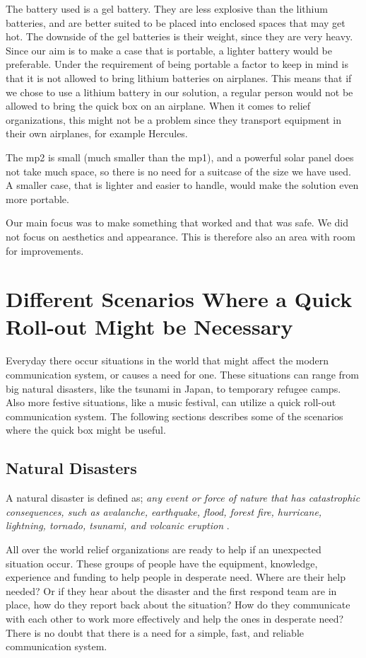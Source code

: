 The battery used is a gel battery. They are less explosive than the lithium batteries, and are better suited to be placed into enclosed spaces that may get hot. The downside of the gel batteries is their weight, since they are very heavy. Since our aim is to make a case that is portable, a lighter battery would be preferable. Under the requirement of being portable a factor to keep in mind is that it is not allowed to bring lithium batteries on airplanes. This means that if we chose to use a lithium battery in our solution, a regular person would not be allowed to bring the \gls{quick} box on an airplane. When it comes to relief organizations, this might not be a problem since they transport equipment in their own airplanes, for example Hercules. 

The \gls{mp2} is small (much smaller than the \gls{mp1}), and a powerful solar panel does not take much space, so there is no need for a suitcase of the size we have used. A smaller case, that is lighter and easier to handle, would make the solution even more portable. 

Our main focus was to make something that worked and that was safe. We did not focus on aesthetics and appearance. This is therefore also an area with room for improvements. 

 
\section{Different Scenarios Where a Quick Roll-out Might be Necessary}
Everyday there occur situations in the world that might affect the modern communication system, or causes a need for one. These situations can range from big natural disasters, like the tsunami in Japan, to temporary refugee camps. Also more festive situations, like a music festival, can utilize a quick roll-out communication system. The following sections describes some of the scenarios where the \gls{quick} box might be useful. 

\subsection{Natural Disasters}
A natural disaster is defined as; \textit{any event or force of nature that has catastrophic consequences, such as avalanche, earthquake, flood, forest fire, hurricane, lightning, tornado, tsunami, and volcanic eruption} \cite{naturalDisaster}.

All over the world relief organizations are ready to help if an unexpected situation occur. These groups of people have the equipment, knowledge, experience and funding to help people in desperate need. Where are their help needed? Or if they hear about the disaster and the first respond team are in place, how do they report back about the situation? How do they communicate with each other to work more effectively and help the ones in desperate need? There is no doubt that there is a need for a simple, fast, and reliable communication system.

